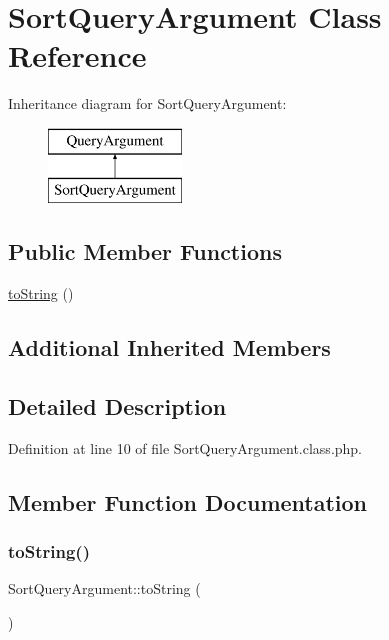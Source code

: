 \hypertarget{classSortQueryArgument}{}\section{Sort\+Query\+Argument Class Reference}
\label{classSortQueryArgument}
Inheritance diagram for Sort\+Query\+Argument\+:\begin{figure}[H]
\begin{center}
\leavevmode
\includegraphics[height=2.000000cm]{classSortQueryArgument}
\end{center}
\end{figure}
\subsection*{Public Member Functions}
\begin{DoxyCompactItemize}
\item 
\hyperlink{classSortQueryArgument_aab3ed55d1387843d144500c68d92c24c}{to\+String} ()
\end{DoxyCompactItemize}
\subsection*{Additional Inherited Members}


\subsection{Detailed Description}


Definition at line 10 of file Sort\+Query\+Argument.\+class.\+php.



\subsection{Member Function Documentation}
\hypertarget{classSortQueryArgument_aab3ed55d1387843d144500c68d92c24c}{}\label{classSortQueryArgument_aab3ed55d1387843d144500c68d92c24c} 
\subsubsection{\texorpdfstring{to\+String()}{toString()}}
{\footnotesize\ttfamily Sort\+Query\+Argument\+::to\+String (\begin{DoxyParamCaption}{ }\end{DoxyParamCaption})}

